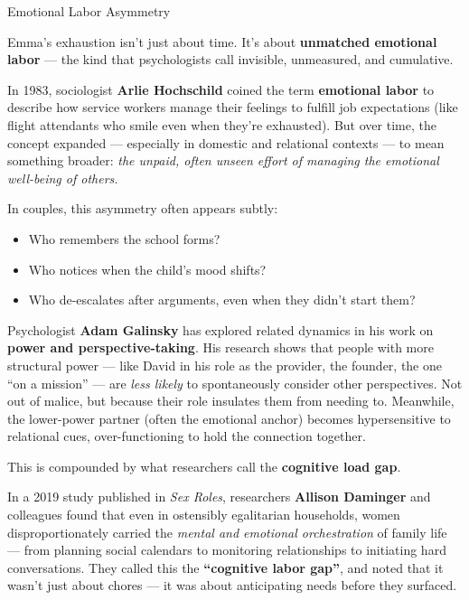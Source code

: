 \begin{PsychologicalSidebar}{Emotional Labor Asymmetry}

    Emma’s exhaustion isn’t just about time.  
    It’s about \textbf{unmatched emotional labor} — the kind that psychologists call invisible, unmeasured, 
    and cumulative.
    
    \medskip
    
    In 1983, sociologist \textbf{Arlie Hochschild} coined the term \textbf{emotional labor} to describe 
    how service workers manage their feelings to fulfill job expectations (like flight attendants who smile 
    even when they’re exhausted). But over time, the concept expanded — especially in domestic and 
    relational contexts — to mean something broader:  
    \textit{the unpaid, often unseen effort of managing the emotional well-being of others.}
    
    \medskip
    
    In couples, this asymmetry often appears subtly:  

    \medskip

    \begin{itemize}
      \item Who remembers the school forms?
      \item Who notices when the child’s mood shifts?
      \item Who de-escalates after arguments, even when they didn’t start them?
    \end{itemize}
    
    \medskip
    
    Psychologist \textbf{Adam Galinsky} has explored related dynamics in his work on \textbf{power and 
    perspective-taking}. His research shows that people with more structural power — like David in his 
    role as the provider, the founder, the one “on a mission” — are \textit{less likely} to spontaneously 
    consider other perspectives. Not out of malice, but because their role insulates them from needing 
    to. Meanwhile, the lower-power partner (often the emotional anchor) becomes hypersensitive to 
    relational cues, over-functioning to hold the connection together.
    
    \medskip
    
    This is compounded by what researchers call the \textbf{cognitive load gap}.

    \medskip
    
    In a 2019 study published in \textit{Sex Roles}, researchers \textbf{Allison Daminger} and colleagues 
    found that even in ostensibly egalitarian households, women disproportionately carried the 
    \textit{mental and emotional orchestration} of family life — from planning social calendars to 
    monitoring relationships to initiating hard conversations. They called this the \textbf{“cognitive 
    labor gap”}, and noted that it wasn’t just about chores — it was about anticipating needs before 
    they surfaced.
    

\end{PsychologicalSidebar}
